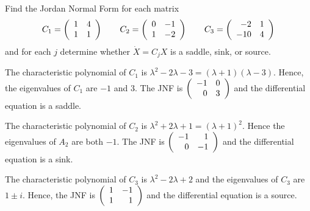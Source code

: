 \documentclass{ximera}
\author{Matthew Carr}
\begin{document}

\begin{exercise}\label{mc11_3A}

Find the Jordan Normal Form for each matrix 
\[
C_1 = \left(\begin{array}{rrrrrrrrrrrrrrrrrr}  1 & 4 \\ 1 & 1 \end{array}\right) \qquad C_2 = \left(\begin{array}{rrrrrrrrrrrrrrrrrr}  0 & -1 \\ 1 & -2  \end{array}\right) \qquad C_3 = \left(\begin{array}{rrrrrrrrrrrrrrrrrr}  -2 & 1 \\ -10 & 4 \end{array}\right)
\]
and for each $j$ determine whether $\dot{X} = C_jX$ is a saddle, sink, or source.
  
\begin{solution}


\soln The characteristic polynomial of $C_1$ is $\lambda^2 -2\lambda -3 = (\lambda+1)(\lambda-3)$.  Hence, the eigenvalues of $C_1$ are $-1$ and $3$.  The JNF is $\left(\begin{array}{rrrrrrrrrrrrrrrrrr} -1 & 0 \\ 0 & 3 \end{array}\right)$ and the differential equation is a saddle.

The characteristic polynomial of $C_2$ is $\lambda^2 +2\lambda+ 1 = (\lambda+1)^2$.  Hence the eigenvalues of $A_2$ are both $-1$.  The JNF is $\left(\begin{array}{rrrrrrrrrrrrrrrrrr} -1 & 1 \\ 0 & -1 \end{array}\right)$ and the differential equation is a sink.

The characteristic polynomial of $C_3$ is $\lambda^2 - 2\lambda + 2$ and the eigenvalues of $C_3$ are $1 \pm i$.  Hence, the JNF is $\left(\begin{array}{rrrrrrrrrrrrrrrrrr} 1 & -1 \\ 1 & 1 \end{array}\right)$ and the differential equation is a source.


\end{solution}
\end{exercise}
\end{document}
